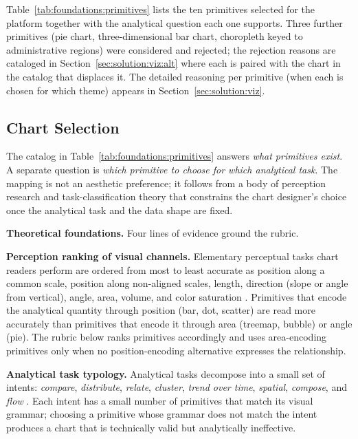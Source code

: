 Table~\ref{tab:foundations:primitives} lists the ten primitives selected
for the platform together with the analytical question each one
supports. Three further primitives (pie chart, three-dimensional bar
chart, choropleth keyed to administrative regions) were considered and
rejected; the rejection reasons are cataloged in
Section~\ref{sec:solution:viz:alt} where each is paired with the chart
in the catalog that displaces it. The detailed reasoning per
primitive (when each is chosen for which theme) appears in
Section~\ref{sec:solution:viz}.

\subsection{Chart Selection}
\label{sec:foundations:primitives:rubric}

The catalog in Table~\ref{tab:foundations:primitives} answers \textit{what
primitives exist}. A separate question is \textit{which primitive to choose
for which analytical task}. The mapping is not an aesthetic preference;
it follows from a body of perception research and task-classification
theory that constrains the chart designer's choice once the analytical
task and the data shape are fixed.

\noindent\textbf{Theoretical foundations.} Four lines of evidence ground the rubric.

\textbf{Perception ranking of visual channels.}
Elementary perceptual tasks chart readers perform are ordered from
most to least accurate as position along a common scale, position
along non-aligned scales, length, direction (slope or angle from
vertical), angle, area, volume, and color saturation
\cite{cleveland1984}. Primitives that encode the analytical quantity
through position (bar, dot, scatter) are read more accurately than
primitives that encode it through area (treemap, bubble) or angle
(pie). The rubric below ranks primitives accordingly and uses
area-encoding primitives only when no position-encoding alternative
expresses the relationship.

\textbf{Analytical task typology.}
Analytical tasks decompose into a small set of intents:
\emph{compare}, \emph{distribute}, \emph{relate}, \emph{cluster},
\emph{trend over time}, \emph{spatial}, \emph{compose}, and
\emph{flow} \cite{munzner2014}. Each intent has a small number of
primitives that match its visual grammar; choosing a primitive whose
grammar does not match the intent produces a chart that is
technically valid but analytically ineffective.

